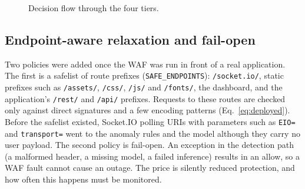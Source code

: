 \documentclass[preprint,11pt]{elsarticle}
\let\scriptsize\normalsize
\begin{document}
\begin{figure}[t]
\centering
{}
\caption{Decision flow through the four tiers.}
\label{fig:flow}
\end{figure}

\subsection{Endpoint-aware relaxation and fail-open}
Two policies were added once the WAF was run in front of a real
application. The first is a safelist of route prefixes
(\texttt{SAFE\_ENDPOINTS}): \texttt{/socket.io/}, static prefixes such as
\texttt{/assets/}, \texttt{/css/}, \texttt{/js/} and \texttt{/fonts/}, the
dashboard, and the application's \texttt{/rest/} and \texttt{/api/}
prefixes. Requests to these routes are checked only against direct
signatures and a few encoding patterns (Eq.~\eqref{eq:deployed}). Before
the safelist existed, Socket.IO polling URIs with parameters such as
\texttt{EIO=} and \texttt{transport=} went to the anomaly rules and the
model although they carry no user payload. The second policy is fail-open.
An exception in the detection path (a malformed header, a missing model, a
failed inference) results in an allow, so a WAF fault cannot cause an
outage. The price is silently reduced protection, and how often this
happens must be monitored.
\end{document}
